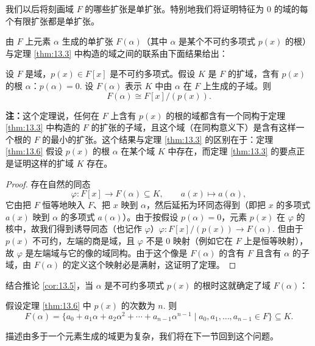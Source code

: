 我们以后将刻画域 \(F\) 的哪些扩张是单扩张。特别地我们将证明特征为 0 的域的每个有限扩张都是单扩张。

由 \(F\) 上元素 \(\alpha\) 生成的单扩张 \(F(\alpha)\)（其中 \(\alpha\) 是某个不可约多项式 \(p(x)\) 的根）与定理 \ref{thm:13.3} 中构造的域之间的联系由下面结果给出：

\begin{theorem}\label{thm:13.6}
设 \(F\) 是域，\(p(x) \in F[x]\) 是不可约多项式。假设 \(K\) 是 \(F\) 的扩域，含有 \(p(x)\) 的根 \(\alpha\)：\(p(\alpha) = 0\). 设 \(F(\alpha)\) 表示 \(K\) 中由 \(\alpha\) 在 \(F\) 上生成的子域。则
\[
F(\alpha) \cong F[x]/(p(x)).
\]
\end{theorem}

\noindent\textbf{注：}这个定理说，任何在 \(F\) 上含有 \(p(x)\) 的根的域都含有一个同构于定理 \ref{thm:13.3} 中构造的 \(F\) 的扩张的子域，且这个域（在同构意义下）是含有这样一个根的 \(F\) 的最小的扩张。这个结果与定理 \ref{thm:13.3} 的区别在于：定理 \ref{thm:13.6} 假设 \(p(x)\) 的根 \(\alpha\) 在某个域 \(K\) 中存在，而定理 \ref{thm:13.3} 的要点正是证明这样的扩域 \(K\) 存在。

\begin{proof}
存在自然的同态
\[
\varphi : F[x] \to F(\alpha) \subseteq K, \qquad a(x) \mapsto a(\alpha),
\]
它由把 \(F\) 恒等地映入 \(F\)、把 \(x\) 映到 \(\alpha\)，然后延拓为环同态得到（即把 \(x\) 的多项式 \(a(x)\) 映到 \(\alpha\) 的多项式 \(a(\alpha)\)）。由于按假设 \(p(\alpha) = 0\)，元素 \(p(x)\) 在 \(\varphi\) 的核中，故我们得到诱导同态（也记作 \(\varphi\)）\(\varphi : F[x]/(p(x)) \to F(\alpha)\). 但由于 \(p(x)\) 不可约，左端的商是域，且 \(\varphi\) 不是 0 映射（例如它在 \(F\) 上是恒等映射），故 \(\varphi\) 是左端域与它的像的域同构。由于这个像是 \(F(\alpha)\) 的含有 \(F\) 且含有 \(\alpha\) 的子域，由 \(F(\alpha)\) 的定义这个映射必是满射，这证明了定理。
\end{proof}

结合推论 \ref{cor:13.5}，当 \(\alpha\) 是不可约多项式 \(p(x)\) 的根时这就确定了域 \(F(\alpha)\)：

\begin{corollary}\label{cor:13.7}
假设定理 \ref{thm:13.6} 中 \(p(x)\) 的次数为 \(n\). 则
\[
F(\alpha) = \{a_0+a_1\alpha+a_2\alpha^2+\cdots+a_{n-1}\alpha^{n-1} \mid a_0, a_1, \ldots, a_{n-1} \in F\} \subseteq K.
\]
\end{corollary}

描述由多于一个元素生成的域更为复杂，我们将在下一节回到这个问题。

